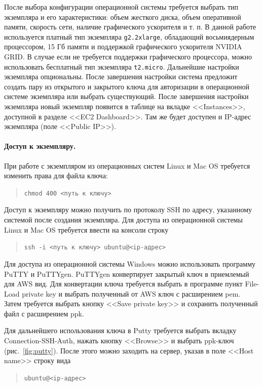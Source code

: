 \documentclass[12pt]{article}
\begin{document}
После выбора конфигурации операционной системы требуется выбрать тип экземпляра и его характеристики: объем жесткого диска, объем оперативной памяти, скорость сети, наличие графического ускорителя и т. п. В данной работе используется платный тип экземпляра \texttt{g2.2xlarge}, обладающий восьмиядерным процессором, 15 Гб памяти и поддержкой графического ускорителя NVIDIA GRID. В случае если не требуется поддержки графического процессора, можно использовать бесплатный тип экземпляра \texttt{t2.micro}. Дальнейшие настройки экземпляра опциональны. После завершения настройки система предложит создать пару из открытого и закрытого ключа для авторизации в операционной системе экземпляра или выбрать существующий. После завершения настройки экземпляра новый экземпляр появится в таблице на вкладке <<Instances>>, доступной в разделе <<EC2 Dashboard>>. Там же будет доступен и IP-адрес экземпляра (поле <<Public IP>>).


\paragraph{Доступ к экземпляру.}
При работе с экземпляром из операционных систем Linux и Mac OS требуется изменить права для файла ключа:
\begin{quote}
\tt{chmod 400 <путь к ключу>}
\end{quote}

Доступ к экземпляру можно получить по протоколу SSH по адресу, указанному системой после создания экземпляра.
Для доступа из операционной системы Linux и Mac OS требуется ввести на консоли строку
\begin{quote}
\tt{ssh -i <путь к ключу> ubuntu@<ip-адрес>}
\end{quote}

Для доступа из операционной системы Windows можно использовать программу PuTTY и PuTTYgen. PuTTYgen конвертирует закрытый ключ в приемлемый для AWS вид.
Для конвертации ключа требуется выбрать в программе пункт
File-Load private key и выбрать полученный от AWS ключ с расширением pem. Затем требуется выбрать кнопку <<Save private key>> и сохранить полученный файл с расширением ppk.

Для дальнейшего использования ключа в Putty требуется выбрать вкладку Connection-SSH-Auth, нажать кнопку <<Browse>> и выбрать ppk-ключ (рис.~\ref{fig:putty}). После этого можно заходить на сервер, указав в поле <<Host name>> строку вида
\begin{quote}
\tt{ubuntu@<ip-адрес>}
\end{quote}
\end{document}
